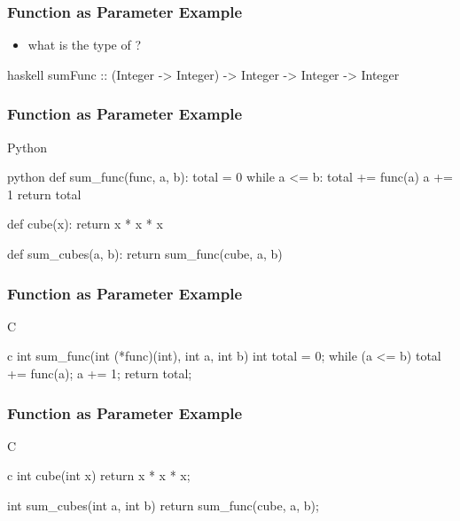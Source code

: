 \documentclass[dvipsnames]{beamer}
\theoremstyle{plain}
\begin{document}
\begin{frame}[fragile]
  \frametitle{Function as Parameter Example}

  \begin{itemize}
    \item what is the type of ?
  \end{itemize}

  \pause
  \begin{exampleblock}{}
    \begin{pygments}{haskell}
sumFunc :: (Integer -> Integer)
              -> Integer -> Integer -> Integer
    \end{pygments}
  \end{exampleblock}
\end{frame}

\begin{frame}[fragile]
  \frametitle{Function as Parameter Example}

  \begin{exampleblock}{Python}
    \begin{pygments}{python}
def sum_func(func, a, b):
    total = 0
    while a <= b:
        total += func(a)
        a += 1
    return total

def cube(x):
    return x * x * x

def sum_cubes(a, b):
    return sum_func(cube, a, b)
    \end{pygments}
  \end{exampleblock}
\end{frame}

\begin{frame}[fragile]
  \frametitle{Function as Parameter Example}

  \begin{exampleblock}{C}
    \begin{pygments}{c}
int sum_func(int (*func)(int), int a, int b)
{
    int total = 0;
    while (a <= b) {
        total += func(a);
        a += 1;
    }
    return total;
}
    \end{pygments}
  \end{exampleblock}
\end{frame}

\begin{frame}[fragile]
  \frametitle{Function as Parameter Example}

  \begin{exampleblock}{C}
    \begin{pygments}{c}
int cube(int x)
{
    return x * x * x;
}

int sum_cubes(int a, int b)
{
    return sum_func(cube, a, b);
}
    \end{pygments}
  \end{exampleblock}
\end{frame}
\end{document}
